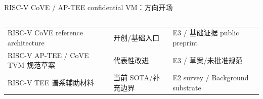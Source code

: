 \begin{frame}[t,shrink=6]{RISC-V CoVE / AP-TEE confidential VM：方向开场}
\begin{columns}[T,totalwidth=\textwidth]
\begin{column}{0.49\textwidth}
{\begin{minipage}[t]{0.97\linewidth}
\begin{minipage}{0.92\linewidth}
{\begin{tabularx}{\linewidth}{@{}YYY@{}}
\midrule
RISC-V CoVE reference architecture & 开创/基础入口 & E3 / 基础证据 public preprint \\
RISC-V AP-TEE / CoVE TVM 规范草案 & 代表性改进 & E3 / 草案/未批准规范 \\
RISC-V TEE 谱系辅助材料 & 当前 SOTA/补充边界 & E2 survey / Background substrate \\
\bottomrule
\end{tabularx}
}
    \end{minipage}
    \vspace{1mm}
  \end{minipage}}
  \end{column}
\end{columns}
\end{frame}


